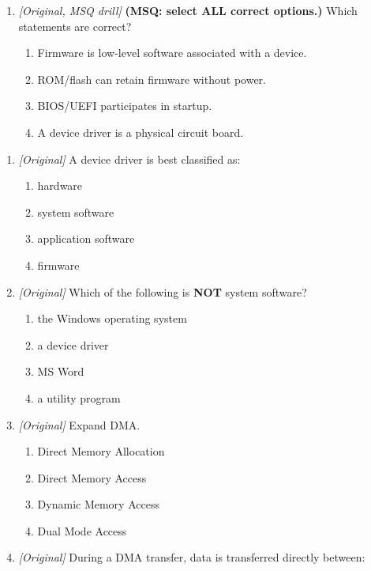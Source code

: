 \begin{enumerate}[label=\textbf{Q\arabic*.}, leftmargin=*]
\item \textit{[Original, MSQ drill]} \textbf{(MSQ: select ALL correct options.)} Which statements are correct?
  \begin{enumerate}[label=\Alph*.]
\item Firmware is low-level software associated with a device.
   \item ROM/flash can retain firmware without power.
   \item BIOS/UEFI participates in startup.
   \item A device driver is a physical circuit board.
  \end{enumerate}

\end{enumerate}
\begin{enumerate}[label=\textbf{Q\arabic*.}, leftmargin=*]
\item \textit{[Original]} A device driver is best classified as:
  \begin{enumerate}[label=\Alph*.]
    \item hardware
    \item system software
    \item application software
    \item firmware
  \end{enumerate}
\item \textit{[Original]} Which of the following is \textbf{NOT} system
  software?
  \begin{enumerate}[label=\Alph*.]
    \item the Windows operating system
    \item a device driver
    \item MS Word
    \item a utility program
  \end{enumerate}
\item \textit{[Original]} Expand DMA.
  \begin{enumerate}[label=\Alph*.]
    \item Direct Memory Allocation
    \item Direct Memory Access
    \item Dynamic Memory Access
    \item Dual Mode Access
  \end{enumerate}
\item \textit{[Original]} During a DMA transfer, data is transferred directly
  between:
  \begin{enumerate}[label=\Alph*.]

\end{enumerate}
\end{enumerate}
